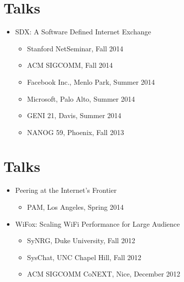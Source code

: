 \documentclass[11pt]{res}
\begin{document}
\begin{resume}
\begin{itemize}

\end{itemize}

\section{{Talks}}
\begin{itemize} \itemsep -2pt
\item SDX: A Software Defined Internet Exchange
\begin{itemize} 
\item Stanford NetSeminar, Fall 2014
\item ACM SIGCOMM, Fall 2014
\item Facebook Inc., Menlo Park, Summer 2014
\item Microsoft, Palo Alto, Summer 2014
\item GENI 21, Davis, Summer 2014
\item NANOG 59, Phoenix, Fall 2013
\end{itemize}
\end{itemize}

\newpage

\section{{Talks}}
\begin{itemize} \itemsep -2pt
\item Peering at the Internet's Frontier
\begin{itemize} 
\item PAM, Los Angeles, Spring 2014
\end{itemize}

\item WiFox: Scaling WiFi Performance for Large Audience
\begin{itemize} 
\item SyNRG, Duke University, Fall 2012
\item SysChat, UNC Chapel Hill, Fall 2012
\item ACM SIGCOMM CoNEXT, Nice, December 2012
\end{itemize}

\end{itemize}





\end{resume}
\end{document}
